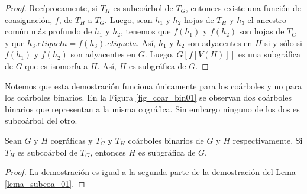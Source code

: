 \begin{proof}
    Rec\'iprocamente, si $T_H$ es subcoárbol de $T_G$, entonces existe
    una función de coasignación, $f$, de $T_H$ a $T_G$. Luego, sean $h_1$ y
    $h_2$ hojas de $T_H$ y $h_3$ el ancestro común más profundo de $h_1$ y
    $h_2$, tenemos que $f(h_1)$ y $f(h_2)$ son hojas de $T_G$ y que
    $h_3.etiqueta = f(h_3).etiqueta$. Así, $h_1$ y $h_2$ son adyacentes
    en $H$ si y sólo si $f(h_1)$ y $f(h_2)$ son adyacentes en $G$. Luego,
    $G[f[V(H)]]$ es una subgráfica de $G$ que es isomorfa a $H$. Así, $H$
    es subgráfica de $G$.

\end{proof}

Notemos que esta demostración funciona únicamente para los coárboles y no para los coárboles binarios. En la Figura \ref{fig_coar_bin01} se observan dos coárboles binarios que representan a la misma cográfica. Sin embargo ninguno de los dos es subcoárbol del otro.

\begin{lemma}
    Sean $G$ y $H$ cográficas y $T_G$ y $T_H$ coárboles binarios de $G$ y $H$ respectivamente. Si $T_H$ es subcoárbol de $T_G$, entonces $H$ es subgráfica de $G$.
\end{lemma}

\begin{proof}
    La demostración es igual a la segunda parte de la demostración del Lema \ref{lema_subcoa_01}.
\end{proof}

